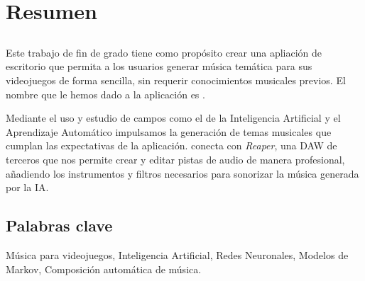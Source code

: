 \chapter*{Resumen}

\section*{\tituloPortadaVal}

Este trabajo de fin de grado tiene como propósito crear una apliación de escritorio que permita a los usuarios generar música temática para sus videojuegos de forma sencilla, sin requerir conocimientos musicales previos. El nombre que le hemos dado a la aplicación es \appName{}.

Mediante el uso y estudio de campos como el de la Inteligencia Artificial y el Aprendizaje Automático impulsamos la generación de temas musicales que cumplan las expectativas de la aplicación. \appName{} conecta con \textit{Reaper}, una DAW de terceros que nos permite crear y editar pistas de audio de manera profesional, añadiendo los instrumentos y filtros necesarios para sonorizar la música generada por la IA.


\section*{Palabras clave}
   
\noindent Música para videojuegos, Inteligencia Artificial, Redes Neuronales, Modelos de Markov, Composición automática de música.

   


